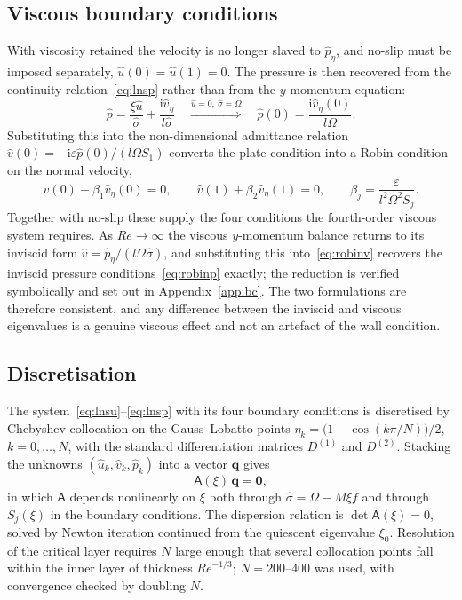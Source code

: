 \documentclass[11pt,a4paper]{article}
\newcommand{\Om}{\Omega}
\newcommand{\eps}{\varepsilon}
\newcommand{\ii}{\mathrm{i}}
\newcommand{\Rey}{\mathit{Re}}
\newcommand{\sig}{\hat\sigma}
\theoremstyle{plain}
\theoremstyle{remark}
\begin{document}
\subsection{Viscous boundary conditions}
With viscosity retained the velocity is no longer slaved to $\hat p_\eta$, and no-slip must be imposed
separately, $\hat u(0)=\hat u(1)=0$. The pressure is then recovered from the continuity
relation~\eqref{eq:lnsp} rather than from the $y$-momentum equation:
\begin{equation}
\hat p=\frac{\xi\hat u}{\sig}+\frac{\ii\hat v_\eta}{l\sig}
\quad\overset{\hat u=0,\ \sig=\Om}{\Longrightarrow}\quad
\hat p(0)=\frac{\ii\hat v_\eta(0)}{l\Om}.
\end{equation}
Substituting this into the non-dimensional admittance relation
$\hat v(0)=-\ii\eps\hat p(0)/(l\Om S_1)$ converts the plate condition into a Robin condition on the
normal velocity,
\begin{equation}
\boxed{\;\hat v(0)-\beta_1\hat v_\eta(0)=0,\qquad
\hat v(1)+\beta_2\hat v_\eta(1)=0,\qquad
\beta_j=\frac{\eps}{l^2\Om^2S_j}.\;}
\label{eq:robinv}
\end{equation}
Together with no-slip these supply the four conditions the fourth-order viscous system requires. As
$\Rey\to\infty$ the viscous $y$-momentum balance returns to its inviscid form
$\hat v=\hat p_\eta/(l\Om\sig)$, and substituting this into~\eqref{eq:robinv} recovers the inviscid
pressure conditions~\eqref{eq:robinp} exactly; the reduction is verified symbolically and set out in
Appendix~\ref{app:bc}. The two formulations are therefore consistent, and any difference between the
inviscid and viscous eigenvalues is a genuine viscous effect and not an artefact of the wall condition.

\subsection{Discretisation}
The system~\eqref{eq:lnsu}--\eqref{eq:lnsp} with its four boundary conditions is discretised by
Chebyshev collocation on the Gauss--Lobatto points $\eta_k=\bigl(1-\cos(k\pi/N)\bigr)/2$,
$k=0,\dots,N$, with the standard differentiation matrices $D^{(1)}$ and $D^{(2)}$. Stacking the
unknowns $(\hat u_k,\hat v_k,\hat p_k)$ into a vector $\mathbf q$ gives
\begin{equation}
\mathsf A(\xi)\,\mathbf q=\mathbf 0,
\end{equation}
in which $\mathsf A$ depends nonlinearly on $\xi$ both through $\sig=\Om-M\xi f$ and through
$S_j(\xi)$ in the boundary conditions. The dispersion relation is $\det\mathsf A(\xi)=0$, solved by
Newton iteration continued from the quiescent eigenvalue $\xi_0$. Resolution of the critical layer
requires $N$ large enough that several collocation points fall within the inner layer of thickness
$\Rey^{-1/3}$; $N=200$--$400$ was used, with convergence checked by doubling $N$.
\end{document}
